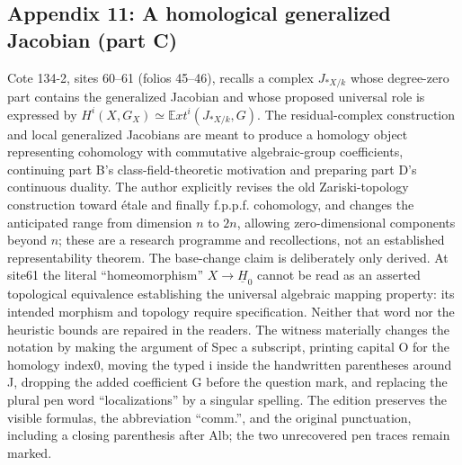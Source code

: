 \documentclass[10pt,oneside]{book}
\begin{document}
\subsection*{Appendix 11: A homological generalized Jacobian (part C)}
Cote 134-2, sites 60--61 (folios 45--46), recalls a complex $J_{*X/k}$ whose degree-zero part contains the generalized Jacobian and whose proposed universal role is expressed by $H^i(X,G_X)\simeq\mathbb E xt^i(J_{*X/k},G)$. The residual-complex construction and local generalized Jacobians are meant to produce a homology object representing cohomology with commutative algebraic-group coefficients, continuing part B's class-field-theoretic motivation and preparing part D's continuous duality. The author explicitly revises the old Zariski-topology construction toward étale and finally f.p.p.f. cohomology, and changes the anticipated range from dimension $n$ to $2n$, allowing zero-dimensional components beyond $n$; these are a research programme and recollections, not an established representability theorem. The base-change claim is deliberately only derived. At site61 the literal ``homeomorphism'' $X\to\underline H_0$ cannot be read as an asserted topological equivalence establishing the universal algebraic mapping property: its intended morphism and topology require specification. Neither that word nor the heuristic bounds are repaired in the readers. The witness materially changes the notation by making the argument of Spec a subscript, printing capital O for the homology index0, moving the typed i inside the handwritten parentheses around J, dropping the added coefficient G before the question mark, and replacing the plural pen word ``localizations'' by a singular spelling. The edition preserves the visible formulas, the abbreviation ``comm.'', and the original punctuation, including a closing parenthesis after Alb; the two unrecovered pen traces remain marked.
\end{document}
